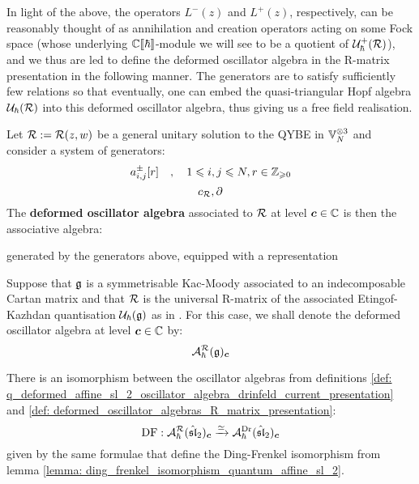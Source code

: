         In light of the above, the operators $L^-(z)$ and $L^+(z)$, respectively, can be reasonably thought of as annihilation and creation operators acting on some Fock space (whose underlying $\mathbb{C}[\![\hbar]\!]$-module we will see to be a quotient of $\mathcal{U}_{\hbar}^+(\mathcal{R})$), and we thus are led to define the deformed oscillator algebra in the R-matrix presentation in the following manner. The generators are to satisfy sufficiently few relations so that eventually, one can embed the quasi-triangular Hopf algebra $\mathcal{U}_{\hbar}(\mathcal{R})$ into this deformed oscillator algebra, thus giving us a free field realisation.
        \begin{definition} \label{def: deformed_oscillator_algebras_R_matrix_presentation}
            Let $\mathcal{R} := \mathcal{R}(z, w)$ be a general unitary solution to the QYBE in $\bbV_N^{\tensor 3}$ and consider a system of generators:
                $$a^{\pm}_{i, j}[r] \quad, \quad 1 \leqslant i, j \leqslant N, r \in \mathbb{Z}_{\geqslant 0}$$
                $$c_{\mathcal{R}}, \partial$$
            The \textbf{deformed oscillator algebra} associated to $\mathcal{R}$ at level $\boldsymbol{c} \in \mathbb{C}$ is then the associative algebra:
            
            generated by the generators above, equipped with a representation 
        \end{definition}
        \begin{convention}
            Suppose that $\mathfrak{g}$ is a symmetrisable Kac-Moody associated to an indecomposable Cartan matrix and that $\mathcal{R}$ is the universal R-matrix of the associated Etingof-Kazhdan quantisation $\mathcal{U}_{\hbar}(\mathfrak{g})$ as in \cite{etingof_kazhdan_quantisation_6}. For this case, we shall denote the deformed oscillator algebra at level $\boldsymbol{c} \in \mathbb{C}$ by:
                $$\mathcal{A}_{\hbar}^{\mathcal{R}}(\mathfrak{g})_{\boldsymbol{c}}$$
        \end{convention}
        \begin{lemma} \label{lemma: ding_frenkel_isomorphism_oscillator_algebras}
            There is an isomorphism between the oscillator algebras from definitions \ref{def: q_deformed_affine_sl_2_oscillator_algebra_drinfeld_current_presentation} and \ref{def: deformed_oscillator_algebras_R_matrix_presentation}:
                $$\operatorname{DF}: \mathcal{A}_{\hbar}^{\mathcal{R}}(\hat{\mathfrak{sl}}_2)_{\boldsymbol{c}} \xrightarrow[]{\simeq} \mathcal{A}_{\hbar}^{\mathrm{Dr}}(\hat{\mathfrak{sl}}_2)_{\boldsymbol{c}}$$
            given by the same formulae that define the Ding-Frenkel isomorphism from lemma \ref{lemma: ding_frenkel_isomorphism_quantum_affine_sl_2}.
        \end{lemma}
